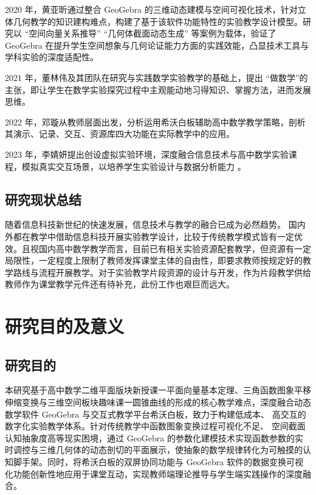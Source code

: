 2020 年，黄亚昕通过整合 GeoGebra 的三维动态建模与空间可视化技术，针对立体几何教学的知识建构难点，构建了基于该软件功能特性的实验教学设计模型。研究以 “空间向量关系推导” “几何体截面动态生成” 等案例为载体，验证了 GeoGebra 在提升学生空间想象与几何论证能力方面的实践效能，凸显技术工具与学科实验的深度适配性\cite{2020_黄亚昕_基于GeoGebra的立体几何教学研究}。

2021 年，董林伟及其团队在研究与实践数学实验教学的基础上，提出 “做数学”的主张，即让学生在数学实验探究过程中主观能动地习得知识、掌握方法，进而发展思维\cite{2021_董林伟}。

2022 年，邓璇从教师层面出发，分析运用希沃白板辅助高中数学教学策略，剖析其演示、记录、交互、资源库四大功能在实际教学中的应用\cite{2022_邓璇_高中数学运用希沃白板辅助教学的策略}。

2023 年，李婧妍提出创设虚拟实验环境，深度融合信息技术与高中数学实验课程，模拟真实交互场景，以培养学生实验设计与数据分析能力 \cite{2023_李婧妍_谈信息技术与高中数学课程的整合}。

\subsection{研究现状总结}

随着信息科技新世纪的快速发展，信息技术与教学的融合已成为必然趋势。 国内外都在教学中借助信息科技开展实验教学设计，比较于传统教学模式皆有一定优效。且视国内高中数学教学而言，目前已有相关实验资源配套教学，但资源有一定局限性，一定程度上限制了教师发挥课堂主体的自由性，即要求教师按规定好的教学路线与流程开展教学。对于实验教学片段资源的设计与开发，作为片段教学供给教师作为课堂教学元件还有待补充，此份工作也艰巨而远大。

\section{研究目的及意义}

\subsection{研究目的}

本研究基于高中数学二维平面版块新授课一平面向量基本定理、三角函数图象平移伸缩变换与三维空间板块趣味课一圆锥曲线的形成的核心教学难点，深度融合动态数学软件 GeoGebra 与交互式教学平台希沃白板，致力于构建低成本、 高交互的数字化实验教学体系。针对传统教学中函数图象变换过程可视化不足、 空间截面认知抽象度高等现实困境，通过 GeoGebra 的参数化建模技术实现函数参数的实时调控与三维几何体的动态剖切的平面展示，使抽象的数学规律转化为可触摸的认知脚手架。同时，将希沃白板的双屏协同功能与 GeoGebra 软件的数据变换可视化功能创新性地应用于课堂互动，实现教师端理论推导与学生端实践操作的深度融合。

